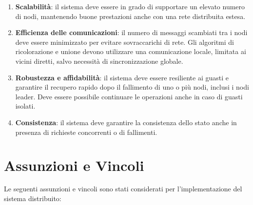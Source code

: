 \documentclass[12pt, a4paper]{report}
\begin{document}
\begin{enumerate}
    \item \textbf{Scalabilit\`a}: il sistema deve essere in grado di supportare un elevato numero di nodi, mantenendo buone prestazioni anche con una rete distribuita estesa.

    \item \textbf{Efficienza delle comunicazioni}: il numero di messaggi scambiati tra i nodi deve essere minimizzato per evitare sovraccarichi di rete. Gli algoritmi di ricolorazione e unione devono utilizzare una comunicazione locale, limitata ai vicini diretti, salvo necessit\`a di sincronizzazione globale.

    \item \textbf{Robustezza e affidabilit\`a}: il sistema deve essere resiliente ai guasti e garantire il recupero rapido dopo il fallimento di uno o pi\`u nodi, inclusi i nodi leader. Deve essere possibile continuare le operazioni anche in caso di guasti isolati.

    \item \textbf{Consistenza}: il sistema deve garantire la consistenza dello stato anche in presenza di richieste concorrenti o di fallimenti.

\end{enumerate}

\section{Assunzioni e Vincoli}

Le seguenti assunzioni e vincoli sono stati considerati per l'implementazione del sistema distribuito:
\end{document}
